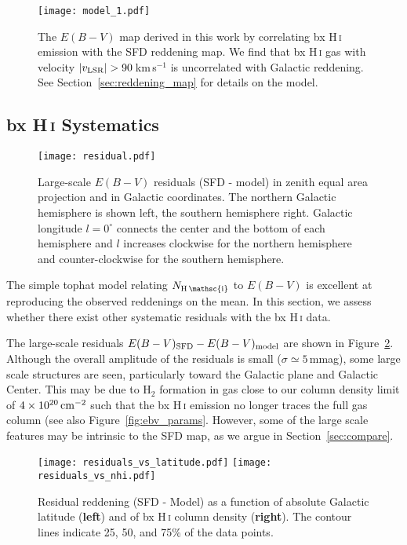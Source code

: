 \documentclass[iop,apj]{emulateapj}
\makeatletter
\def\testbx{bx}%
\DeclareRobustCommand{\ion}[2]{%
\relax\ifmmode
\ifx\testbx\f@series
{\mathbf{#1\,\mathsc{#2}}}\else
{\mathrm{#1\,\mathsc{#2}}}\fi
\else\textup{#1\,{\mdseries\textsc{#2}}}%
\fi}
\makeatother
\begin{document}
\begin{figure*}[tp]
	\texttt{[image: model\_1.pdf]}
	\caption{The $E(B-V)$ map derived in this work by correlating \ion{H}{i} emission with the SFD reddening map. We find that \ion{H}{i} gas with velocity $|v_{\rm LSR}| > 90$\,km\,s$^{-1}$ is uncorrelated with Galactic reddening. See Section~\ref{sec:reddening_map} for details on the model.}
	\label{fig:model}
\end{figure*}

\subsection{\ion{H}{i} Systematics}
\begin{figure*}[tp]
	\texttt{[image: residual.pdf]}
	\caption{Large-scale $E(B-V)$ residuals (SFD - model) in zenith equal area projection and in Galactic coordinates. The northern Galactic hemisphere is shown left, the southern hemisphere right. Galactic longitude $l=0^{\circ}$ connects the center and the bottom of each hemisphere and $l$ increases clockwise for the northern hemisphere and counter-clockwise for the southern hemisphere.}
	\label{fig:mollweide_residual}
\end{figure*}

The simple tophat model relating $N_\ion{H}{i}$ to $E(B-V)$ is excellent at reproducing the observed reddenings on the mean. In this section, we assess whether there exist other systematic residuals with the \ion{H}{i} data.

The large-scale residuals $E(B-V)_{\rm SFD} - E(B-V)_{\rm model}$ are shown in Figure~\ref{fig:mollweide_residual}. Although the overall amplitude of the residuals is small ($\sigma \simeq 5\,$mmag), some large scale structures are seen, particularly toward the Galactic plane and Galactic Center. This may be due to H$_2$ formation in gas close to our column density limit of $4\times 10^{20}\,\rm cm^{-2}$ such that the \ion{H}{i} emission no longer traces the full gas column (see also Figure~\ref{fig:ebv_params}. However, some of the large scale features may be intrinsic to the SFD map, as we argue in Section~\ref{sec:compare}.

\begin{figure*}[tp]
	\texttt{[image: residuals\_vs\_latitude.pdf]}
    	\texttt{[image: residuals\_vs\_nhi.pdf]}
	\caption{Residual reddening (SFD - Model) as a function of absolute Galactic latitude (\textbf{left}) and of  \ion{H}{i} column density (\textbf{right}). The contour lines indicate 25, 50, and 75\% of the data points.}
	\label{fig:residuals_vs_lat_and_nhi}
\end{figure*}
\end{document}
